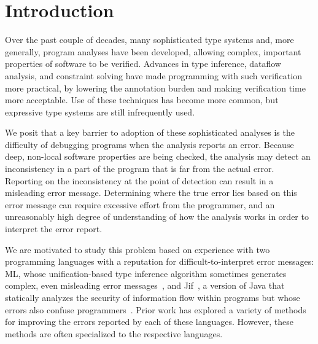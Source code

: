 \begin{abstract}

\end{abstract}

\section{Introduction}

Over the past couple of decades, many sophisticated type systems and,
more generally, program analyses have been developed, allowing
complex, important properties of software to be verified. Advances in
type inference, dataflow analysis, and constraint solving have made
programming with such verification more practical, by lowering the
annotation burden and making verification time more acceptable.  Use
of these techniques has become more common, but expressive type
systems are still infrequently used.

We posit that a key barrier to adoption of these sophisticated
analyses is the difficulty of debugging programs when the analysis
reports an error. Because deep, non-local software properties are
being checked, the analysis may detect an inconsistency in a part of
the program that is far from the actual error. Reporting on the
inconsistency at the point of detection can result in a misleading
error message. Determining where the true error lies based on this
error message can require excessive effort from the programmer, and an
unreasonably high degree of understanding of how the analysis works
in order to interpret the error report.

We are motivated to study this problem based on experience with two
programming languages with a reputation for difficult-to-interpret
error messages: ML, whose unification-based type inference algorithm
sometimes generates complex, even misleading error
messages~\cite{wand-errorfinding}, and Jif~\cite{jif}, a version of
Java that statically analyzes the security of information flow within
programs but whose errors also confuse programmers~\cite{king:fse}.
Prior work has explored a variety of methods for improving the errors
reported by each of these languages. However, these methods are often
specialized to the respective languages.

